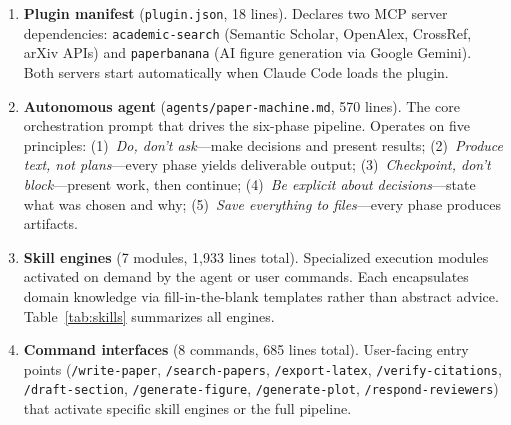 \begin{enumerate}
  \item \textbf{Plugin manifest} (\texttt{plugin.json}, 18 lines). Declares two MCP server dependencies: \texttt{academic-search} (Semantic Scholar, OpenAlex, CrossRef, arXiv APIs) and \texttt{paperbanana} (AI figure generation via Google Gemini). Both servers start automatically when Claude Code loads the plugin.

  \item \textbf{Autonomous agent} (\texttt{agents/paper-machine.md}, 570 lines). The core orchestration prompt that drives the six-phase pipeline. Operates on five principles: (1)~\textit{Do, don't ask}---make decisions and present results; (2)~\textit{Produce text, not plans}---every phase yields deliverable output; (3)~\textit{Checkpoint, don't block}---present work, then continue; (4)~\textit{Be explicit about decisions}---state what was chosen and why; (5)~\textit{Save everything to files}---every phase produces artifacts.

  \item \textbf{Skill engines} (7 modules, 1{,}933 lines total). Specialized execution modules activated on demand by the agent or user commands. Each encapsulates domain knowledge via fill-in-the-blank templates rather than abstract advice. Table~\ref{tab:skills} summarizes all engines.

  \item \textbf{Command interfaces} (8 commands, 685 lines total). User-facing entry points (\texttt{/write-paper}, \texttt{/search-papers}, \texttt{/export-latex}, \texttt{/verify-citations}, \texttt{/draft-section}, \texttt{/generate-figure}, \texttt{/generate-plot}, \texttt{/respond-reviewers}) that activate specific skill engines or the full pipeline.
\end{enumerate}

